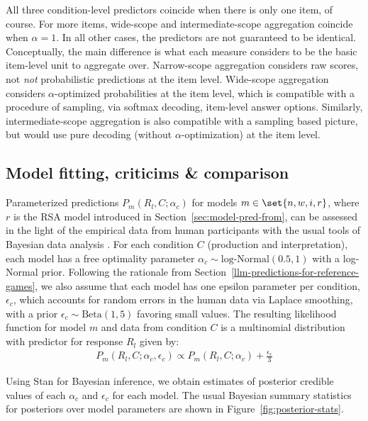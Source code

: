 \documentclass[fleqn]{article}
\begin{document}
All three condition-level predictors coincide when there is only one item, of course.
For more items, wide-scope and intermediate-scope aggregation coincide when $\alpha = 1$.
In all other cases, the predictors are not guaranteed to be identical.
Conceptually, the main difference is what each measure considers to be the basic item-level unit to aggregate over.
Narrow-scope aggregation considers raw scores, not \emph{not} probabilistic predictions at the item level.
Wide-scope aggregation considers $\alpha$-optimized probabilities at the item level, which is compatible with a procedure of sampling, via softmax decoding, item-level answer options.
Similarly, intermediate-scope aggregation is also compatible with a sampling based picture, but would use pure decoding (without $\alpha$-optimization) at the item level.

\subsection{Model fitting, criticims \& comparison}
\label{sec:model-fitting}

Parameterized predictions $P_{m}(R_{l}, C ; \alpha_{c})$ for models $m \in \set{n,w,i,r}$, where $r$ is the RSA model introduced in Section~\ref{sec:model-pred-from}, can be assessed in the light of the empirical data from human participants with the usual tools of Bayesian data analysis \citep[e.g.][]{GelmanCarlin2014:Bayesian-Data-A,McElreath2016:Statistical-Ret,Lambert2018:A-Students-Guid}.
For each condition $C$ (production and interpretation), each model has a free optimality parameter $\alpha_{c}\sim \text{log-Normal}(0.5,1)$ with a log-Normal prior.
Following the rationale from Section~\ref{llm-predictions-for-reference-games}, we also assume that each model has one epsilon parameter per condition, $\epsilon_{c}$, which accounts for random errors in the human data via Laplace smoothing, with a prior $\epsilon_{c} \sim \text{Beta}(1,5)$ favoring small values.
The resulting likelihood function for model $m$ and data from condition $C$ is a multinomial distribution with predictor for response $R_{l}$ given by:
%
\begin{align*}
  P_{m}(R_{l}, C; \alpha_{c}, \epsilon_{c}) \propto P_{m}(R_{l}, C; \alpha_{c}) +  \frac{\epsilon_{c}}{3}
\end{align*}

Using Stan \citep{Team2023:The-Stan-Core-L} for Bayesian inference, we obtain estimates of posterior credible values of each $\alpha_{c}$ and $\epsilon_{c}$ for each model.
The usual Bayesian summary statistics for posteriors over model parameters are shown in Figure~\ref{fig:posterior-stats}.
\end{document}
